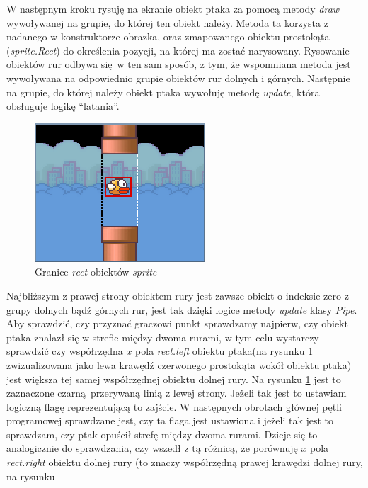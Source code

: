 \documentclass[a4paper, 12pt,oneside]{book}
\begin{document}
W następnym kroku rysuję na ekranie obiekt ptaka za pomocą metody \textit{draw}
wywoływanej na grupie, do której ten obiekt należy. Metoda ta korzysta z
nadanego w konstruktorze obrazka, oraz zmapowanego obiektu prostokąta
(\textit{sprite.Rect}) do określenia pozycji, na której ma zostać
narysowany\cite{pygame_group_draw_documentation}. Rysowanie obiektów rur odbywa
się w ten sam sposób, z tym, że wspomniana metoda jest wywoływana na
odpowiednio grupie obiektów rur dolnych i górnych. Następnie na grupie, do
której należy obiekt ptaka wywołuję metodę \textit{update}, która obsługuje
logikę ``latania''.

\begin{figure} 
	\begin{center}
		\includegraphics[scale=1.10]{flappy_scoring.png}
		\caption{Granice \textit{rect} obiektów \textit{sprite}}
		\label{flappy_scoring_fig}
	\end{center}
\end{figure}
Najbliższym z prawej strony obiektem rury jest zawsze obiekt o indeksie zero
z grupy dolnych bądź górnych rur, jest tak dzięki logice metody \textit{update}
klasy \textit{Pipe}. Aby sprawdzić, czy przyznać graczowi punkt sprawdzamy
najpierw, czy obiekt ptaka znalazł się w strefie między dwoma rurami, w tym
celu wystarczy sprawdzić czy współrzędna $x$ pola \textit{rect.left} obiektu
ptaka(na rysunku \ref{flappy_scoring_fig} zwizualizowana jako lewa krawędź
czerwonego prostokąta wokół obiektu ptaka) jest większa tej samej współrzędnej
obiektu dolnej rury. Na rysunku \ref{flappy_scoring_fig} jest to zaznaczone
czarną przerywaną linią z lewej strony. Jeżeli tak jest to ustawiam logiczną
flagę reprezentującą to zajście.
W następnych obrotach głównej pętli programowej sprawdzane jest, czy ta flaga
jest ustawiona i jeżeli tak jest to sprawdzam, czy ptak opuścił strefę między
dwoma rurami. Dzieje się to analogicznie do sprawdzania, czy wszedł z tą
różnicą, że porównuję $x$ pola \textit{rect.right} obiektu dolnej rury (to
znaczy współrzędną prawej krawędzi dolnej rury, na rysunku
\end{document}
